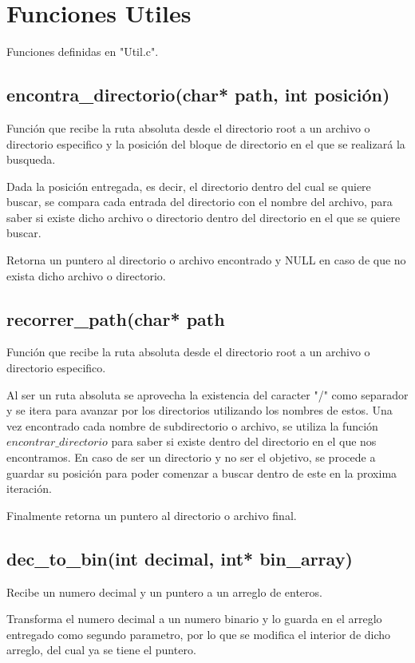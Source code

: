 \documentclass[12pt]{article}
\begin{document}
\section{Funciones Utiles}
Funciones definidas en "Util.c".

\subsection{encontra\_directorio(char* path, int posición)}
Función que recibe la ruta absoluta desde el directorio root a un archivo o directorio especifico y la posición del bloque de directorio en el que se realizará la busqueda. 

Dada la posición entregada, es decir, el directorio dentro del cual se quiere buscar, se compara cada entrada del directorio con el nombre del archivo, para saber si existe dicho archivo o directorio dentro del directorio en el que se quiere buscar. 

Retorna un puntero al directorio o archivo encontrado y NULL en caso de que no exista dicho archivo o directorio.

\subsection{recorrer\_path(char* path}
Función que recibe la ruta absoluta desde el directorio root a un archivo o directorio especifico.

Al ser un ruta absoluta se aprovecha la existencia del caracter "/" como separador y se itera para avanzar por los directorios utilizando los nombres de estos. Una vez encontrado cada nombre de subdirectorio o archivo, se utiliza la función $encontrar\_directorio$ para saber si existe dentro del directorio en el que nos encontramos. En caso de ser un directorio y no ser el objetivo, se procede a guardar su posición para poder comenzar a buscar dentro de este en la proxima iteración. 

Finalmente retorna un puntero al directorio o archivo final.

\subsection{dec\_to\_bin(int decimal, int* bin\_array)}
Recibe un numero decimal y un puntero a un arreglo de enteros.

Transforma el numero decimal a un numero binario y lo guarda en el arreglo entregado como segundo parametro, por lo que se modifica el interior de dicho arreglo, del cual ya se tiene el puntero.
\end{document}
